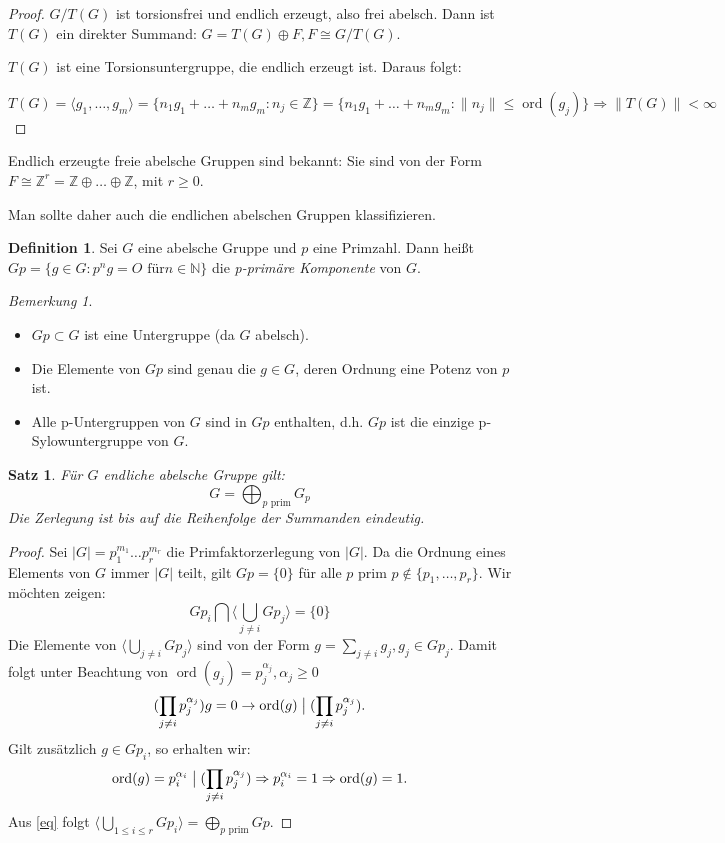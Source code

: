 \documentclass[12pt]{scrartcl} %
\DeclareMathOperator{\ord}{ord}
\newcommand{\divides}{\mathrel{\bigm|}}
\newtheorem{thm}{Satz}
\theoremstyle{definition}
\newtheorem*{defn}{Definition}
\theoremstyle{remark}
\newtheorem*{nb}{Bemerkung}
\begin{document}
\begin{proof}
$G/T(G)$ ist torsionsfrei und endlich erzeugt, also frei abelsch. Dann ist $T(G)$ ein direkter Summand: $G = T(G) \oplus F,F\cong G/T(G)$.

$T(G)$ ist eine Torsionsuntergruppe, die endlich erzeugt ist. Daraus folgt: 

$T(G)=\langle g_{1}, \dots ,g_{m}\rangle=\{ n_{1}g_{1}+ \dots +n_{m}g_{m}:n_{j}\in \mathbb{Z}\}=\{ n_{1}g_{1}+\dots+n_{m}g_{m}:\|n_{j}\| \leq \ord(g_{j})\} \Rightarrow \|T(G)\| < \infty$
\end{proof}

Endlich erzeugte freie abelsche Gruppen sind bekannt: Sie sind von der Form $F\cong \mathbb{Z}^{r}=\mathbb{Z} \oplus \dots\oplus \mathbb{Z}$, mit $r\geq 0$.

Man sollte daher auch die endlichen abelschen Gruppen klassifizieren.

\begin{defn}
Sei $G$ eine abelsche Gruppe und $p$ eine Primzahl. 
Dann heißt $Gp=\{ g\in G:p^{n}g=O\text{ für} n \in \mathbb{N} \} $ 
die \emph{p-primäre Komponente} von $G$.
\end{defn}

\begin{nb}
\begin{itemize}
\item $Gp\subset G$ ist eine Untergruppe (da $G$ abelsch).
\item Die Elemente von $Gp$ sind genau die $g\in G$, deren Ordnung eine Potenz von $p$ ist.
\item Alle p-Untergruppen von $G$ sind in $Gp$ enthalten, d.h. $Gp$ ist die einzige p-Sylowuntergruppe von $G$.
\end{itemize}
\end{nb}

\begin{thm}
Für $G$ endliche abelsche Gruppe gilt:
\[ G=\bigoplus_{p \text{ prim}} G_{p} \]
Die Zerlegung ist bis auf die Reihenfolge der Summanden eindeutig.
\end{thm}

\begin{proof}
Sei $| G| =p_{1}^{m_{1}}\dots p_{r}^{m_{r}}$ die Primfaktorzerlegung von $| G|$. 
Da die Ordnung eines Elements von $G$ immer $| G|$ teilt, gilt $Gp=\{ 0\}$ für alle $p$ prim $p\notin \{ p_{1},\dots,p_{r}\}$. Wir möchten zeigen:
\begin{equation} \label{eq}
Gp_{i} \bigcap \langle\bigcup_{j\neq i} Gp_{j} \rangle = \{ 0 \}
\end{equation}
Die Elemente von $\langle\bigcup_{j\neq i} Gp_{j}\rangle$ sind von der Form $g=\sum_{j\neq i} g_{j}, g_{j} \in Gp_{j}$. Damit folgt unter Beachtung von $\ord(g_{j})=p_{j}^{\alpha_{j}}, \alpha_{j}\geq 0$ 
\[(\prod_{j\neq i} p_{j}^{\alpha_{j}})g=0 \rightarrow \ord(g) \divides (\prod_{j\neq i} p_{j}^{\alpha_{j}}).\]
Gilt zusätzlich $g \in Gp_{i}$, so erhalten wir:
\[ \ord(g)=p_{i}^{\alpha_{i}} \divides (\prod_{j\neq i} p_{j}^{\alpha_{j}})\Rightarrow p_{i}^{\alpha_{i}}=1 \Rightarrow \ord(g)=1.\]
Aus \eqref{eq} folgt $\langle\bigcup_{1\leq i\leq r} Gp_{i}\rangle = \bigoplus_{p\text{ prim}} Gp$.
\end{proof}
\end{document}
